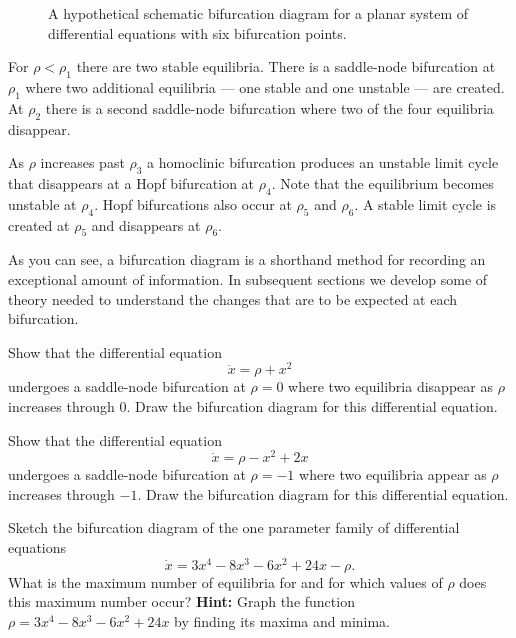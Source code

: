 \begin{figure}[htb]
           \centerline{%
           }
  	   \caption{A hypothetical schematic bifurcation diagram for a planar 
	  system of differential equations with six bifurcation points.} 
           \label{F:hypo}
\end{figure}

For $\rho<\rho_1$
there are two stable equilibria.  There is a saddle-node bifurcation 
at $\rho_1$ where two additional equilibria --- one stable and one 
unstable --- are created.  At $\rho_2$ there is a second saddle-node 
bifurcation where two of the four equilibria disappear.  

As $\rho$ increases past $\rho_3$ a homoclinic 
bifurcation produces an
unstable limit cycle that disappears at a 
Hopf bifurcation at $\rho_4$.  
Note that the equilibrium becomes unstable at $\rho_4$.
Hopf bifurcations also occur at $\rho_5$ and $\rho_6$.   A stable
limit cycle is created at $\rho_5$ and disappears at $\rho_6$.

As you can see, a  bifurcation diagram is a shorthand method for recording
an exceptional amount of information.  In subsequent sections we develop 
some of theory needed to understand the changes that are to be expected 
at each bifurcation.  

\EXER

\TEXER

\begin{exercise} \label{c9.7.1}
Show that the differential equation 
\[
\dot{x} = \rho + x^2
\]
undergoes a saddle-node bifurcation at $\rho=0$ where two equilibria 
disappear as $\rho$ increases through $0$.  Draw the bifurcation diagram 
for this differential equation.
\end{exercise}

\begin{exercise} \label{c9.7.2}
Show that the differential equation
\[
\dot{x} = \rho - x^2 + 2x
\]
undergoes a saddle-node bifurcation at $\rho=-1$ where two equilibria
appear as $\rho$ increases through $-1$.  Draw the bifurcation diagram
for this differential equation.
\end{exercise}

\begin{exercise} \label{c9.7.3}
Sketch the bifurcation diagram of the one parameter family of differential 
equations
\begin{equation} \label{E:ex2}
\dot{x} = 3x^4 - 8x^3 - 6x^2 + 24x - \rho.
\end{equation}
What is the maximum number of equilibria for  and for which 
values of $\rho$ does this maximum number occur? {\bf Hint:} Graph the 
function $\rho=3x^4 - 8x^3 - 6x^2 + 24x$ by finding its maxima and minima. 
\end{exercise}

